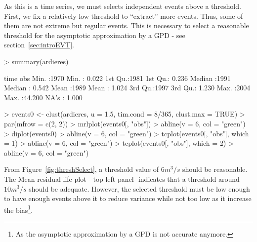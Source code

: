\documentclass[a4paper]{article}
\numberwithin{equation}{section}
\theoremstyle{definition}
\begin{document}
As this is a time series, we must selects independent events above a
threshold. First, we fix a relatively low threshold to ``extract''
more events. Thus, some of them are not extreme but regular
events. This is necessary to select a reasonable threshold for the
asymptotic approximation by a GPD - see section~\ref{sec:introEVT}.
\begin{Schunk}
\begin{Sinput}
> summary(ardieres)
\end{Sinput}
\begin{Soutput}
      time           obs        
 Min.   :1970   Min.   : 0.022  
 1st Qu.:1981   1st Qu.: 0.236  
 Median :1991   Median : 0.542  
 Mean   :1989   Mean   : 1.024  
 3rd Qu.:1997   3rd Qu.: 1.230  
 Max.   :2004   Max.   :44.200  
                NA's   : 1.000  
\end{Soutput}
\begin{Sinput}
> events0 <- clust(ardieres, u = 1.5, tim.cond = 8/365, clust.max = TRUE)
> par(mfrow = c(2, 2))
> mrlplot(events0[, "obs"])
> abline(v = 6, col = "green")
> diplot(events0)
> abline(v = 6, col = "green")
> tcplot(events0[, "obs"], which = 1)
> abline(v = 6, col = "green")
> tcplot(events0[, "obs"], which = 2)
> abline(v = 6, col = "green")
\end{Sinput}
\end{Schunk}

From Figure~\ref{fig:threshSelect}, a threshold value of $6 m^3/s$
should be reasonable. The Mean residual life plot - top left panel-
indicates that a threshold around $10 m^3/s$ should be
adequate. However, the selected threshold must be low enough to have
enough events above it to reduce variance while not too low as it
increase the bias\footnote{As the asymptotic approximation by a GPD is
  not accurate anymore.}.
\end{document}

